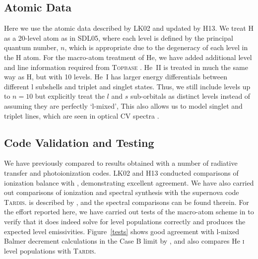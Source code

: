 \documentclass[preprint, a4paper, 11pt]{aastex}
\begin{document}
{\subsection{Atomic Data}
Here we use the atomic data described by LK02 and updated by H13. We treat H as a 20-level atom as in SDL05, where 
each level is defined by the principal quantum number, $n$, which is appropriate due to
the degeneracy of each level in the H atom. For the macro-atom treatment of He, 
we have added additional level and line information required 
from \textsc{Topbase} \citep{topbase2005}.  He~\textsc{II} is treated in much the same way as H,
but with 10 levels. He~\textsc{I} has larger energy differentials between different l subshells
and triplet and singlet states. Thus, we still include levels up to $n=10$ but explicitly 
treat the $l$ and $s$ sub-orbitals as distinct levels instead of assuming they are perfectly `l-mixed',
This also allows us to model singlet and 
triplet lines, which are seen in optical CV spectra \citep[e.g.][]{dhillon1996}.



\subsection{Code Validation and Testing}

We have previously compared \py to results obtained with  a number of radiative transfer and
photoionization codes. LK02 and H13 conducted comparisons of ionization balance 
with \cld \citep{cloudy2013}, demonstrating excellent agreement. 
We have also carried out comparisons
of ionization and spectral synthesis with the supernova code \textsc{Tardis.} \tar is described by
\cite{kerzendorfsim}, and the spectral comparisons can be found therein.
For the effort reported here, we have carried out tests of
the macro-atom scheme in \py to verify that it does indeed solve for level populations correctly
and produces the expected level emissivities. Figure~\ref{tests} shows good agreement with 
l-mixed Balmer decrement calculations in the Case B limit by \cite{seaton1959}, and 
also compares He \textsc{i} level populations with \textsc{Tardis.}



}
\end{document}
